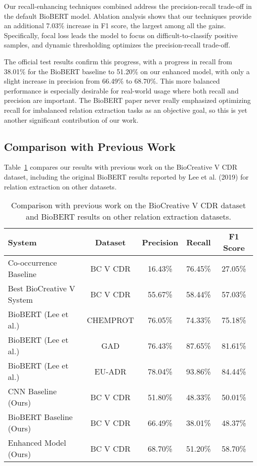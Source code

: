 \documentclass{amia}
\begin{document}
Our recall-enhancing techniques combined address the precision-recall trade-off in the default BioBERT model. Ablation analysis shows that our techniques provide an additional 7.03\% increase in F1 score, the largest among all the gains. Specifically, focal loss leads the model to focus on difficult-to-classify positive samples, and dynamic thresholding optimizes the precision-recall trade-off.

The official test results confirm this progress, with a progress in recall from 38.01\% for the BioBERT baseline to 51.20\% on our enhanced model, with only a slight increase in precision from 66.49\% to 68.70\%. This more balanced performance is especially desirable for real-world usage where both recall and precision are important. The BioBERT paper never really emphasized optimizing recall for imbalanced relation extraction tasks as an objective goal, so this is yet another significant contribution of our work.

\subsection*{Comparison with Previous Work}

Table~\ref{tab:previous} compares our results with previous work on the BioCreative V CDR dataset, including the original BioBERT results reported by Lee et al. (2019) for relation extraction on other datasets.

\begin{table}[H]
\begin{center}
\begin{tabular}{|l|c|c|c|c|}
\hline
\textbf{System} & \textbf{Dataset} & \textbf{Precision} & \textbf{Recall} & \textbf{F1 Score} \\
\hline
Co-occurrence Baseline & BC V CDR & 16.43\% & 76.45\% & 27.05\% \\
\hline
Best BioCreative V System & BC V CDR & 55.67\% & 58.44\% & 57.03\% \\
\hline
BioBERT (Lee et al.) & CHEMPROT & 76.05\% & 74.33\% & 75.18\% \\
\hline
BioBERT (Lee et al.) & GAD & 76.43\% & 87.65\% & 81.61\% \\
\hline
BioBERT (Lee et al.) & EU-ADR & 78.04\% & 93.86\% & 84.44\% \\
\hline
CNN Baseline (Ours) & BC V CDR & 51.80\% & 48.33\% & 50.01\% \\
\hline
BioBERT Baseline (Ours) & BC V CDR & 66.49\% & 38.01\% & 48.37\% \\
\hline
Enhanced Model (Ours) & BC V CDR & 68.70\% & 51.20\% & 58.70\% \\
\hline
\end{tabular}
\end{center}
\caption{Comparison with previous work on the BioCreative V CDR dataset and BioBERT results on other relation extraction datasets.}
\label{tab:previous}
\end{table}
\end{document}
